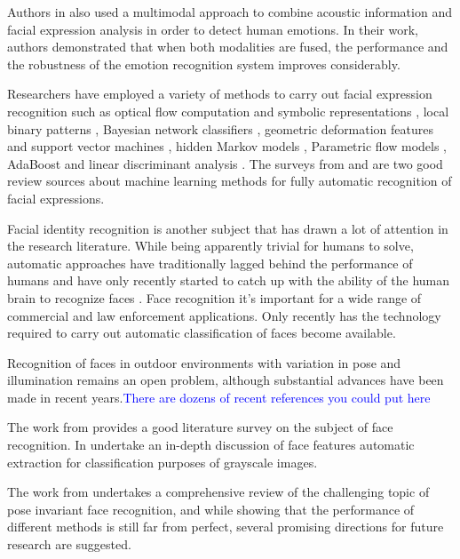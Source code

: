 \documentclass[]{article}
\begin{document}
Authors in \cite{Busso:2004} also used a multimodal approach to combine acoustic information and facial expression
analysis in order to detect human emotions. In their work, authors demonstrated that when both modalities are fused, the performance
and the robustness of the emotion recognition system improves considerably.


Researchers have employed a variety of methods to carry out facial expression recognition such as optical flow
computation  and symbolic representations \cite{Yacoob506414}, local binary patterns \cite{Shan2009803},  Bayesian
network classifiers \cite{Cohen1211408}, geometric deformation features and support vector machines
\cite{kotsia4032815}, hidden Markov models \cite{aleksic1597130, Cohen2003160}, Parametric flow models
\cite{blackAndYacoob}, AdaBoost and linear discriminant analysis \cite{bartlett1398364}. The surveys from
\cite{bartlett1398364} and \cite{Fasel2003259} are two good review sources about machine learning methods 
for fully automatic recognition of facial expressions. 


Facial identity recognition is another subject that has drawn a lot of attention in the research literature. While being
apparently trivial for humans to solve, automatic approaches have traditionally lagged behind the performance of
humans and have only recently started to catch up with the ability of the human brain to recognize faces
\cite{onintelligence, Rozado2012b}. Face recognition it's important  for a wide range of commercial and law enforcement
applications. Only recently has the technology required to carry out automatic classification of faces become
available.

Recognition of faces in outdoor environments with variation in pose
and illumination remains an open problem, although substantial
advances have been made in recent years.\textcolor{blue}{There are
  dozens of recent references you could put here}

The work from \cite{Zhao:2003} provides a good literature survey on the subject of face recognition. In
\cite{Craw1987183} undertake an in-depth discussion of face features automatic extraction for classification purposes of
grayscale images.

The work from \cite{Zhang20092876} undertakes a comprehensive review  of the challenging topic of pose invariant face
recognition, and while showing that the performance of different methods is still far from perfect, several promising
directions for future research  are suggested.
\end{document}

